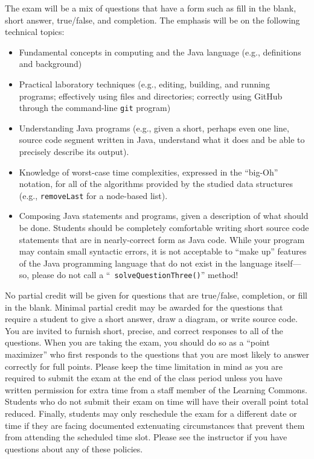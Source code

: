 \documentclass[11pt]{article}
\newcommand{\program}[1]{\lstinline{#1}}
\begin{document}
\noindent The exam will be a mix of questions that have a form such as fill in
the blank, short answer, true/false, and completion. The emphasis will be on the
following technical topics:

\vspace*{-.05in}
\begin{itemize}

  \itemsep 0in

  \item Fundamental concepts in computing and the Java language (e.g.,
    definitions and background)

  \item Practical laboratory techniques (e.g., editing, building, and running
    programs; effectively using files and directories; correctly using GitHub
    through the command-line {\tt git} program)

  \item Understanding Java programs (e.g., given a short, perhaps even one line,
    source code segment written in Java, understand what it does and be able to
    precisely describe its output).

  \item Knowledge of worst-case time complexities, expressed in the ``big-Oh''
    notation, for all of the algorithms provided by the studied data structures
    (e.g., \program{removeLast} for a node-based list).

  \item Composing Java statements and programs, given a description of what
    should be done. Students should be completely comfortable writing short
    source code statements that are in nearly-correct form as Java code. While
    your program may contain small syntactic errors, it is not acceptable to
    ``make up'' features of the Java programming language that do not exist in
    the language itself---so, please do not call a ``{\tt
    solveQuestionThree()}'' method!

\end{itemize}

No partial credit will be given for questions that are true/false, completion,
or fill in the blank. Minimal partial credit may be awarded for the questions
that require a student to give a short answer, draw a diagram, or write source
code. You are invited to furnish short, precise, and correct responses to all of
the questions. When you are taking the exam, you should do so as a ``point
maximizer'' who first responds to the questions that you are most likely to
answer correctly for full points. Please keep the time limitation in mind as you
are required to submit the exam at the end of the class period unless you have
written permission for extra time from a staff member of the Learning Commons.
Students who do not submit their exam on time will have their overall point
total reduced. Finally, students may only reschedule the exam for a different
date or time if they are facing documented extenuating circumstances that
prevent them from attending the scheduled time slot. Please see the instructor
if you have questions about any of these policies.
\end{document}
